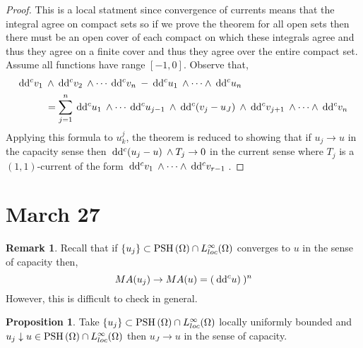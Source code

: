 \documentclass[12pt]{extarticle}
\renewcommand{\d}[1]{\: \mathrm{d}#1 \:}
\theoremstyle{definition}
\newtheorem{proposition}[theorem]{Proposition}
\newtheorem{remark}{Remark}
\begin{document}
\begin{proof}
This is a local statment since convergence of currents means that the integral agree on compact sets so if we prove the theorem for all open sets then there must be an open cover of each compact on which these integrals agree and thus they agree on a finite cover and thus they agree over the entire compact set. 
\bigskip\\
Assume all functions have range $[-1,0]$. Observe that,
\begin{align*}
\d{\dc{v_1}} & \wedge \d{\dc{v_2}} \wedge \cdots \d{\dc{v_n}} - \d{\dc{u_1}} \wedge \cdots \wedge \d{\dc{u_n}}
\\
& = \sum_{j = 1}^n \d{\dc{u_1}} \wedge \cdots \d{\dc{u_{j-1}}} \wedge \d{\dc{(v_j - u_J)}} \wedge \d{\dc{v_{j+1}}} \wedge \cdots \wedge \d{\dc{v_n}} 
\end{align*}
Applying this formula to $u^j_k$, the theorem is reduced to showing that if $u_j \to u$ in the capacity sense then $\d{\dc{(u_j - u)}} \wedge T_j \to 0$ in the current sense where $T_j$ is a $(1,1)$-current of the form $\d{\dc{v_1}} \wedge \cdots \wedge \d{\dc{v_{r-1}}}$. 
\end{proof}

\section{March 27}

\begin{remark}
Recall that if $\{ u_j \} \subset \mathrm{PSH}\left( \Omega \right) \cap L^\infty_{loc}(\Omega)$ converges to $u$ in the sense of capacity then,
\[ MA(u_j) \to MA(u) = (\d{\dc{u})})^n \]
However, this is difficult to check in general.
\end{remark}

\begin{proposition}
Take $\{ u_j \} \subset \mathrm{PSH}\left( \Omega \right) \cap L^\infty_{loc}(\Omega)$ locally uniformly bounded and $u_j \downarrow u \in \mathrm{PSH}\left( \Omega \right) \cap L^\infty_{loc}(\Omega)$ then $u_J \to u$ in the sense of capacity.
\end{proposition}

\newcommand{\ddc}[1]{\d{\dc{#1}}}
\end{document}
